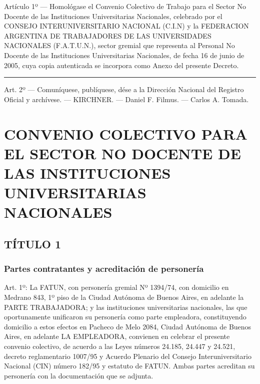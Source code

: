 \documentclass[]{article}
\begin{document}
Artículo 1º --- Homológase el Convenio Colectivo de Trabajo para el
Sector No Docente de las Instituciones Universitarias Nacionales,
celebrado por el CONSEJO INTERUNIVERSITARIO NACIONAL (C.I.N) y la
FEDERACION ARGENTINA DE TRABAJADORES DE LAS UNIVERSIDADES NACIONALES
(F.A.T.U.N.), sector gremial que representa al Personal No Docente de
las Instituciones Universitarias Nacionales, de fecha 16 de junio de
2005, cuya copia autenticada se incorpora como Anexo del presente
Decreto.

\begin{center}\rule{0.5\linewidth}{\linethickness}\end{center}

Art. 2º --- Comuníquese, publíquese, dése a la Dirección Nacional del
Registro Oficial y archívese. --- KIRCHNER. --- Daniel F. Filmus. ---
Carlos A. Tomada.

\section{CONVENIO COLECTIVO PARA EL SECTOR NO DOCENTE DE LAS
INSTITUCIONES UNIVERSITARIAS
NACIONALES}\label{convenio-colectivo-para-el-sector-no-docente-de-las-instituciones-universitarias-nacionales-1}

\subsection{TÍTULO 1}\label{tuxedtulo-1}

\subsubsection{Partes contratantes y acreditación de
personería}\label{partes-contratantes-y-acreditaciuxf3n-de-personeruxeda}

Art. 1º: La FATUN, con personería gremial Nº 1394/74, con domicilio en
Medrano 843, 1º piso de la Ciudad Autónoma de Buenos Aires, en adelante
la PARTE TRABAJADORA; y las instituciones universitarias nacionales, las
que oportunamente unificaron su personería como parte empleadora,
constituyendo domicilio a estos efectos en Pacheco de Melo 2084, Ciudad
Autónoma de Buenos Aires, en adelante LA EMPLEADORA, convienen en
celebrar el presente convenio colectivo, de acuerdo a las Leyes números
24.185, 24.447 y 24.521, decreto reglamentario 1007/95 y Acuerdo
Plenario del Consejo Interuniversitario Nacional (CIN) número 182/95 y
estatuto de FATUN. Ambas partes acreditan su personería con la
documentación que se adjunta.
\end{document}
